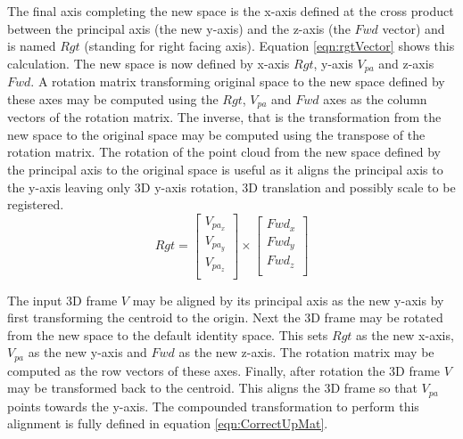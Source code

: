 The final axis completing the new space is the x-axis defined at the cross product between the principal axis (the new y-axis) and the z-axis (the $Fwd$ vector) and is named $Rgt$ (standing for right facing axis). Equation \ref{eqn:rgtVector} shows this calculation. The new space is now defined by x-axis $Rgt$, y-axis $V_{pa}$ and z-axis $Fwd$. A rotation matrix transforming original space to the new space defined by these axes may be computed using the $Rgt$, $V_{pa}$ and $Fwd$ axes as the column vectors of the rotation matrix. The inverse, that is the transformation from the new space to the original space may be computed using the transpose of the rotation matrix. The rotation of the point cloud from the new space defined by the principal axis to the original space is useful as it aligns the principal axis to the y-axis leaving only 3D y-axis rotation, 3D translation and possibly scale to be registered. \\ 


\begin{equation} \label{eqn:rgtVector}
Rgt = \left[
\begin{array}{c}
V_{pa_{x}}\\
V_{pa_{y}}\\
V_{pa_{z}}\\
\end{array}
\right] \times \left[
\begin{array}{c}
Fwd_x\\
Fwd_y\\
Fwd_z\\
\end{array}
\right]
\end{equation}

The input 3D frame $V$ may be aligned by its principal axis as the new y-axis by first transforming the centroid to the origin. Next the 3D frame may be rotated from the new space to the default identity space. This sets $Rgt$ as the new x-axis, $V_{pa}$ as the new y-axis and $Fwd$ as the new z-axis. The rotation matrix may be computed as the row vectors of these axes. Finally, after rotation the 3D frame $V$ may be transformed back to the centroid. This aligns the 3D frame so that $V_{pa}$ points towards the y-axis. The compounded transformation to perform this alignment is fully defined in equation \ref{eqn:CorrectUpMat}. \\

